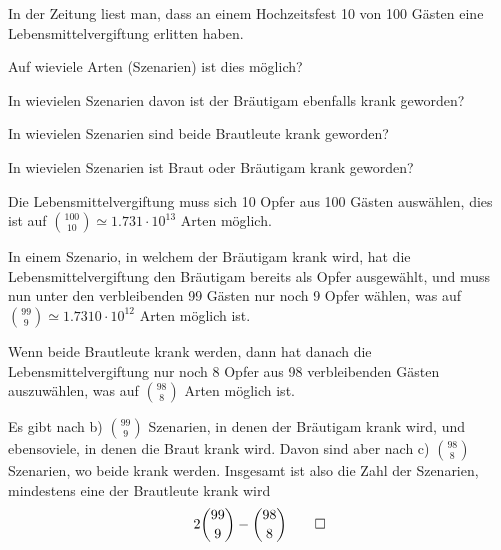 In der Zeitung liest man, dass an einem Hochzeitsfest 10
von 100 Gästen eine Lebensmittelvergiftung erlitten haben.
\begin{teilaufgaben}
\item
Auf wieviele Arten (Szenarien) ist dies möglich?
\item
In wievielen Szenarien
davon ist der Bräutigam ebenfalls krank geworden?
\item In wievielen Szenarien sind beide Brautleute krank
geworden?
\item In wievielen Szenarien ist Braut oder Bräutigam
krank geworden?
\end{teilaufgaben}


\begin{loesung}
\begin{teilaufgaben}
\item Die Lebensmittelvergiftung muss sich 10 Opfer aus 100 Gästen
auswählen, dies ist auf $ \binom{100}{10}\simeq 1.731\cdot10^{13}$
Arten möglich.
\item
In einem Szenario, in welchem der Bräutigam krank wird, hat die
Lebensmittelvergiftung den Bräutigam bereits als Opfer ausgewählt,
und muss nun unter den verbleibenden 99 Gästen nur noch 9 Opfer
wählen, was auf $\binom{99}{9}\simeq1.7310\cdot10^{12}$ Arten
möglich ist.
\item
Wenn beide Brautleute krank werden, dann hat danach die Lebensmittelvergiftung
nur noch 8 Opfer aus 98 verbleibenden Gästen auszuwählen, was auf
$\binom{98}{8}$ Arten möglich ist.
\item
Es gibt nach b) $\binom{99}{9}$ Szenarien, in denen der Bräutigam
krank wird, und ebensoviele, in denen die Braut krank wird. Davon
sind aber nach c) $\binom{98}{8}$ Szenarien, wo beide krank werden.
Insgesamt ist also die Zahl der Szenarien, mindestens eine der Brautleute
krank wird
\[
2\binom{99}{9}-\binom{98}{8}
\qedhere
\]
\end{teilaufgaben}
\end{loesung}

